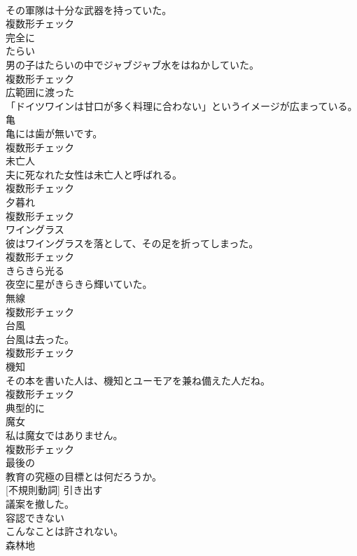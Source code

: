 \documentclass[8pt]{extreport}
\begin{document}
\begin{CJK}{UTF8}{min}
\\	その軍隊は十分な武器を持っていた。	
\\	複数形チェック
\\	[副詞]	完全に	
\\	[名詞]	たらい	
\\	男の子はたらいの中でジャブジャブ水をはねかしていた。	
\\	複数形チェック
\\	[形容詞]	広範囲に渡った	
\\	「ドイツワインは甘口が多く料理に合わない」というイメージが広まっている。	
\\	[名詞]	⻲	
\\	亀には歯が無いです。	
\\	複数形チェック
\\	[名詞]	未亡人	
\\	夫に死なれた女性は未亡人と呼ばれる。	
\\	複数形チェック
\\	[名詞]	夕暮れ	
\\	複数形チェック
\\	[名詞]	ワイングラス	
\\	彼はワイングラスを落として、その足を折ってしまった。	
\\	複数形チェック
\\	[動詞]	きらきら光る	
\\	夜空に星がきらきら輝いていた。	
\\	[名詞]	無線	
\\	複数形チェック
\\	[名詞]	台風	
\\	台風は去った。	
\\	複数形チェック
\\	[名詞]	機知	
\\	その本を書いた人は、機知とユーモアを兼ね備えた人だね。	
\\	複数形チェック
\\	[副詞]	典型的に	
\\	[名詞]	魔女	
\\	私は魔女ではありません。	
\\	複数形チェック
\\	[形容詞]	最後の	
\\	教育の究極の目標とは何だろうか。	
\\	[動詞] [不規則動詞]	引き出す	
\\	議案を撤した。	
\\	[形容詞]	容認できない	
\\	こんなことは許されない。	
\\	[名詞]	森林地	

\end{CJK}
\end{document}
